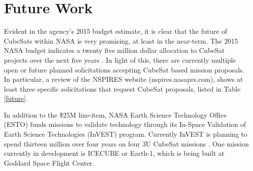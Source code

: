 \documentclass[11pt]{article}
\begin{document}
\begin{table}[h]
\centering
\caption{Processor Specifications}
\label{procspecs}
\end{table}

\section{Future Work}
Evident in the agency's 2015 budget estimate, it is clear that the future of CubeSats within NASA is very promising, at least in the near-term. The 2015 NASA budget indicates a twenty five million dollar allocation to CubeSat projects over the next five years \cite{budget}. In light of this, there are currently multiple open or future planned solicitations accepting CubeSat based mission proposals. In particular, a review of the NSPIRES website (nspires.nasaprs.com), shows at least three specific solicitations that request CubeSat proposals, listed in Table \ref{future}. 

In addition to the \$25M line-item, NASA Earth Science Technology Office (ESTO) funds missions to validate technology through its In-Space Validation of Earth Science Technologies (InVEST) program. Currently InVEST is planning to spend thirteen million over four years on four 3U CubeSat missions \cite{klumpar}. One mission currently in development is ICECUBE or Earth-1, which is being built at Goddard Space Flight Center. 
\end{document}
